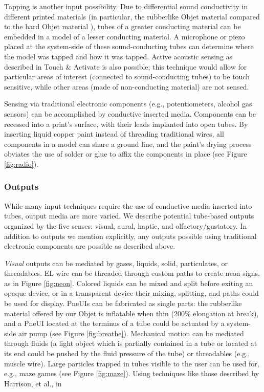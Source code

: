 Tapping is another input possibility.  Due to differential sound conductivity in different printed materials (in particular, the rubberlike Objet material compared to the hard Objet material ), tubes of a greater conducting material can be embedded in a model of a lesser conducting material.  A microphone or piezo placed at the system-side of these sound-conducting tubes can determine where the model was tapped and how it was tapped.  Active acoustic sensing as described in Touch \& Activate \cite{Ono-touchandactivate} is also possible; this technique would allow for particular areas of interest (connected to sound-conducting tubes) to be touch sensitive, while other areas (made of non-conducting material) are not sensed.

Sensing via traditional electronic components (e.g., potentiometers, alcohol gas sensors) can be accomplished by conductive inserted media.  Components can be recessed into a print's surface, with their leads implanted into open tubes.  By inserting liquid copper paint instead of threading traditional wires, all components in a model can share a ground line, and the paint's drying process obviates the use of solder or glue to affix the components in place (see Figure \ref{fig:radio}).

\subsubsection{Outputs}

While many input techniques require the use of conductive media inserted into tubes, output media are more varied.  We describe potential tube-based outputs organized by the five senses: visual, aural, haptic, and olfactory/gustatory.  In addition to outputs we mention explicitly, any outputs possible using traditional electronic components are possible as described above.

\emph{Visual} outputs can be mediated by gases, liquids, solid, particulates, or threadables.  EL wire can be threaded through custom paths to create neon signs, as in Figure \ref{fig:neon}.  Colored liquids can be mixed and split before exiting an opaque device, or in a transparent device their mixing, splitting, and paths could be used for display.  PneUIs \cite{Yao-pneui} can be fabricated as single parts: the rubberlike material offered by our Objet is inflatable when thin (200\% elongation at break), and a PneUI located at the terminus of a tube could be actuated by a system-side air pump (see Figure \ref{fig:breathe}).  Mechanical motion can be mediated through fluids (a light object which is partially contained in a tube or located at its end could be pushed by the fluid pressure of the tube) or threadables (e.g., muscle wire).  Large particles trapped in tubes visible to the user can be used for, e.g., maze games (see Figure \ref{fig:maze}).  Using techniques like those described by Harrison, et al., in \cite{Harrison-buttons}  

